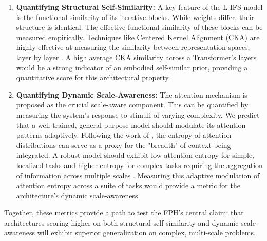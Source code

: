 \documentclass[11pt,a4paper]{article}
\begin{document}
\begin{enumerate}
    \item \textbf{Quantifying Structural Self-Similarity:} A key feature of the L-IFS model is the functional similarity of its iterative blocks. While weights differ, their structure is identical. The effective functional similarity of these blocks can be measured empirically. Techniques like Centered Kernel Alignment (CKA) are highly effective at measuring the similarity between representation spaces, layer by layer \citep{kornblith2019similarity}. A high average CKA similarity across a Transformer's layers would be a strong indicator of an embodied self-similar prior, providing a quantitative score for this architectural property.

    \item \textbf{Quantifying Dynamic Scale-Awareness:} The attention mechanism is proposed as the crucial scale-aware component. This can be quantified by measuring the system's response to stimuli of varying complexity. We predict that a well-trained, general-purpose model should modulate its attention patterns adaptively. Following the work of \cite{zhai2023stabilizing}, the entropy of attention distributions can serve as a proxy for the "breadth" of context being integrated. A robust model should exhibit low attention entropy for simple, localized tasks and higher entropy for complex tasks requiring the aggregation of information across multiple scales \citep{costa2022multiscale}. Measuring this adaptive modulation of attention entropy across a suite of tasks would provide a metric for the architecture's dynamic scale-awareness.
\end{enumerate}
Together, these metrics provide a path to test the FPH's central claim: that architectures scoring higher on both structural self-similarity and dynamic scale-awareness will exhibit superior generalization on complex, multi-scale problems.
\end{document}

